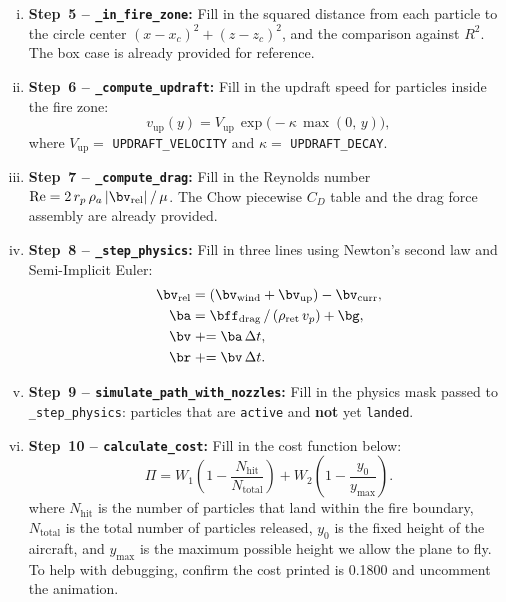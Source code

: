 \documentclass{article}
\begin{document}
\begin{enumerate}
\begin{enumerate}[(i)]
    \item \textbf{Step~5 -- \texttt{\_in\_fire\_zone}:}
          Fill in the squared distance from each particle to the circle center
          $(x - x_c)^2 + (z - z_c)^2$, and the comparison against $R^2$.
          The box case is already provided for reference.

    \item \textbf{Step~6 -- \texttt{\_compute\_updraft}:}
          Fill in the updraft speed for particles inside the fire zone:
          \begin{equation*}
              v_\text{up}(y) = V_\text{up}\,\exp\!\bigl(-\kappa\,\max(0,\,y)\bigr),
          \end{equation*}
          where $V_\text{up} = $ \texttt{UPDRAFT\_VELOCITY} and $\kappa = $ \texttt{UPDRAFT\_DECAY}.

    \item \textbf{Step~7 -- \texttt{\_compute\_drag}:}
          Fill in the Reynolds number
          $\mathrm{Re} = 2\,r_p\,\rho_a\,|\bv_\text{rel}|\,/\,\mu$.
          The Chow piecewise $C_D$ table and the drag force assembly are already provided.

    \item \textbf{Step~8 -- \texttt{\_step\_physics}:}
          Fill in three lines using Newton's second law and Semi-Implicit Euler:
          \begin{align*}
              \bv_\text{rel} &= (\bv_\text{wind} + \bv_\text{up}) - \bv_\text{curr}, \\
              \ba             &= \bff_\text{drag}\,/\,(\rho_\text{ret}\,v_p) + \bg, \\
              \bv             &\mathrel{+}= \ba\,\Delta t, \\ 
              \br              &\mathrel{+}= \bv\,\Delta t.
          \end{align*}

    \item \textbf{Step~9 -- \texttt{simulate\_path\_with\_nozzles}:}
          Fill in the physics mask passed to \texttt{\_step\_physics}:
          particles that are \texttt{active} and \textbf{not} yet \texttt{landed}.

    \item \textbf{Step~10 -- \texttt{calculate\_cost}:}
          Fill in the cost function below:
          \begin{equation*} \label{eq:cost}
              \Pi = W_1\!\left(1 - \frac{N_\text{hit}}{N_\text{total}}\right)
                  + W_2\!\left(1 - \frac{y_0}{y_{\max}}\right).
          \end{equation*}
          where $N_\text{hit}$ is the number of particles that land within the fire boundary,  $N_\text{total}$ is the total number of particles released, $y_0$ is the fixed height of the aircraft, and $y_{\text{max}}$ is the maximum possible height we allow the plane to fly.
To help with debugging, confirm the cost printed is 0.1800 and uncomment the animation.
\end{enumerate}




\end{enumerate}
\end{document}
